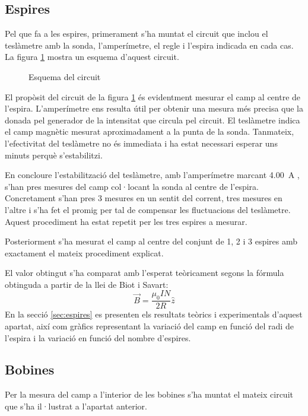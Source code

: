 \subsection{Espires}
Pel que fa a les espires, primerament s'ha muntat el circuit que inclou el teslàmetre amb la sonda, l'amperímetre, el regle i l'espira indicada en cada cas. La figura \cref{fig:esquema circuit} mostra un esquema d'aquest circuit.

\begin{figure}[htb]
  \centering
  \caption{Esquema del circuit}
  \label{fig:esquema circuit}
\end{figure}

El propòsit del circuit de la figura \cref{fig:esquema circuit} és evidentment mesurar el camp al centre de l'espira. L'amperímetre ens resulta útil per obtenir una mesura més precisa que la donada pel generador de la intensitat que circula pel circuit. El teslàmetre indica el camp magnètic mesurat aproximadament a la punta de la sonda. Tanmateix, l'efectivitat del teslàmetre no és immediata i ha estat necessari esperar uns minuts perquè s'estabilitzi.

En concloure l'estabilització del teslàmetre, amb l'amperímetre marcant \SI{4.00}{A} , s'han pres mesures del camp col·locant la sonda al centre de l'espira. Concretament s'han pres 3 mesures en un sentit del corrent, tres mesures en l'altre i s'ha fet el promig per tal de compensar les fluctuacions del teslàmetre. Aquest procediment ha estat repetit per les tres espires a mesurar.

Posteriorment s'ha mesurat el camp al centre del conjunt de 1, 2 i 3 espires amb exactament el mateix procediment explicat.

El valor obtingut s'ha comparat amb l'esperat teòricament segons la fórmula obtinguda a partir de la llei de Biot i Savart:
\begin{equation}\label{eq:camp espira}
  \vec{B}=\frac{\mu_0 I N}{2 R}\hat{z}
\end{equation}
En la secció \cref{sec:espires} es presenten els resultats teòrics i experimentals d'aquest apartat, així com gràfics representant la variació del camp en funció del radi de l'espira i la variació en funció del nombre d'espires.

\subsection{Bobines}
Per la mesura del camp a l'interior de les bobines s'ha muntat el mateix circuit que s'ha il·lustrat a l'apartat anterior. 

